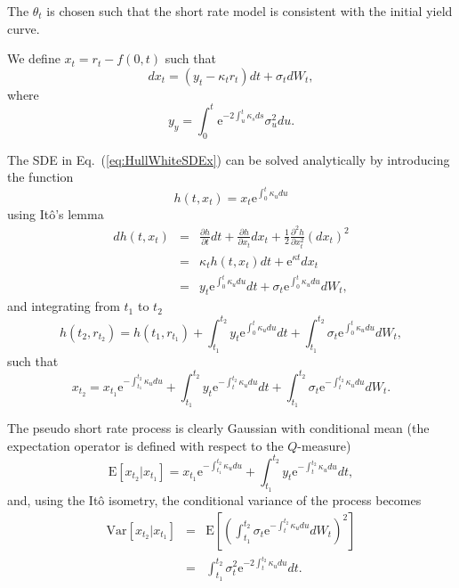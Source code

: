 \documentclass{report}
\newcommand{\E}{\mathrm{E}}
\newcommand{\Var}{\mathrm{Var}}
\newcommand{\e}{\text{e}}
\begin{document}
The $\theta_t$ is chosen such that the short rate model is consistent with the initial yield curve.

We define $x_t = r_t - f(0,t)$ such that
\begin{equation}
dx_t = \left( y_t - \kappa_t r_t \right) dt + \sigma_t dW_t,
\label{eq:HullWhiteSDEx}
\end{equation}
where
\begin{equation}
y_y = \int_0^t \e^{-2\int_u^t \kappa_s ds} \sigma_u^2 du.
\end{equation}

The SDE in Eq.~(\ref{eq:HullWhiteSDEx}) can be solved analytically by introducing the function
\begin{equation}
h(t, x_t) = x_t \e^{\int_0^t \kappa_u du}
\end{equation}
using It\^{o}'s lemma
\begin{eqnarray}
dh(t, x_t) &=& \frac{\partial h}{\partial t} dt + \frac{\partial h}{\partial x_t} dx_t + \frac{1}{2}\frac{\partial^2 h}{\partial x_t^2} \left(dx_t\right)^2 \\
&=& \kappa_t h(t, x_t) dt + \e^{\kappa t} dx_t \\
&=& y_t \e^{\int_0^t \kappa_u du} dt + \sigma_t \e^{\int_0^t \kappa_u du} dW_t,
\end{eqnarray}
and integrating from $t_1$ to $t_2$
\begin{equation}
h(t_2, r_{t_2}) = h(t_1, r_{t_1}) + \int_{t_1}^{t_2} y_t \e^{\int_0^t \kappa_u du} dt + \int_{t_1}^{t_2} \sigma_t \e^{\int_0^t \kappa_u du} dW_t,
\end{equation}
such that
\begin{equation}
x_{t_2} = x_{t_1} \e^{-\int_{t_1}^{t_2} \kappa_u du}  + \int_{t_1}^{t_2} y_t \e^{-\int_t^{t_2} \kappa_u du} dt + \int_{t_1}^{t_2} \sigma_t \e^{-\int_t^{t_2} \kappa_u du} dW_t.
\end{equation}

The pseudo short rate process is clearly Gaussian with conditional mean (the expectation operator is defined with respect to the $Q$-measure)
\begin{equation}
\E \left[ x_{t_2} | x_{t_1} \right] = x_{t_1} \e^{-\int_{t_1}^{t_2} \kappa_u du}  + \int_{t_1}^{t_2} y_t \e^{-\int_t^{t_2} \kappa_u du} dt,
\end{equation}
and, using the It\^{o} isometry, the conditional variance of the process becomes
\begin{eqnarray}
\Var \left[ x_{t_2} | x_{t_1} \right] &=& \E \left[ \left( \int_{t_1}^{t_2} \sigma_t \e^{-\int_t^{t_2} \kappa_u du} dW_t \right)^2 \right] \\
&=& \int_{t_1}^{t_2} \sigma_t^2 \e^{-2\int_t^{t_2} \kappa_u du} dt.
\end{eqnarray}
\end{document}
